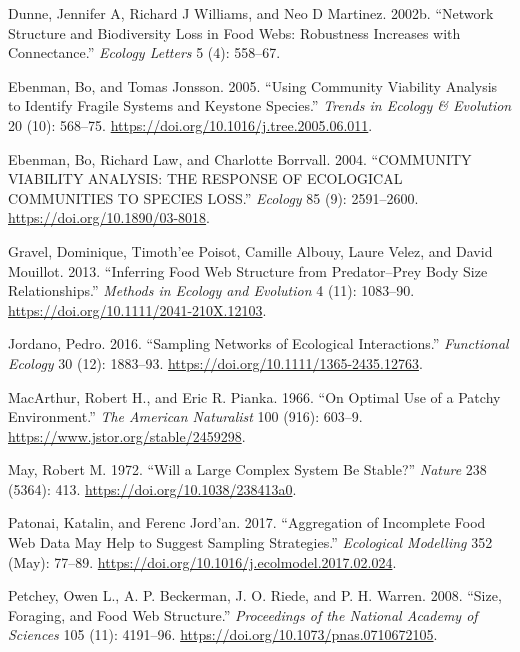 \documentclass{article}
\newlength{\cslhangindent}
\newlength{\cslentryspacingunit} %
\newenvironment{CSLReferences}[2] %
 {%
  \setlength{\parindent}{0pt}
  \ifodd #1
  \let\oldpar\par
  \def\par{\hangindent=\cslhangindent\oldpar}
  \fi
  \setlength{\parskip}{#2\cslentryspacingunit}
 }%
 {}
\begin{document}
\begin{CSLReferences}{1}{0}
\leavevmode{}%
Dunne, Jennifer A, Richard J Williams, and Neo D Martinez. 2002b.
{``Network Structure and Biodiversity Loss in Food Webs: Robustness
Increases with Connectance.''} \emph{Ecology Letters} 5 (4): 558--67.

\leavevmode{}%
Ebenman, Bo, and Tomas Jonsson. 2005. {``Using Community Viability
Analysis to Identify Fragile Systems and Keystone Species.''}
\emph{Trends in Ecology \& Evolution} 20 (10): 568--75.
\url{https://doi.org/10.1016/j.tree.2005.06.011}.

\leavevmode{}%
Ebenman, Bo, Richard Law, and Charlotte Borrvall. 2004. {``{COMMUNITY
VIABILITY ANALYSIS}: {THE RESPONSE OF ECOLOGICAL COMMUNITIES TO SPECIES
LOSS}.''} \emph{Ecology} 85 (9): 2591--2600.
\url{https://doi.org/10.1890/03-8018}.

\leavevmode{}%
Gravel, Dominique, Timoth'ee Poisot, Camille Albouy, Laure Velez, and
David Mouillot. 2013. {``Inferring Food Web Structure from
Predator--Prey Body Size Relationships.''} \emph{Methods in Ecology and
Evolution} 4 (11): 1083--90.
\url{https://doi.org/10.1111/2041-210X.12103}.

\leavevmode{}%
Jordano, Pedro. 2016. {``Sampling Networks of Ecological
Interactions.''} \emph{Functional Ecology} 30 (12): 1883--93.
\url{https://doi.org/10.1111/1365-2435.12763}.

\leavevmode{}%
MacArthur, Robert H., and Eric R. Pianka. 1966. {``On Optimal Use of a
Patchy Environment.''} \emph{The American Naturalist} 100 (916): 603--9.
\url{https://www.jstor.org/stable/2459298}.

\leavevmode{}%
May, Robert M. 1972. {``Will a {Large Complex System} Be {Stable}?''}
\emph{Nature} 238 (5364): 413. \url{https://doi.org/10.1038/238413a0}.

\leavevmode{}%
Patonai, Katalin, and Ferenc Jord'an. 2017. {``Aggregation of Incomplete
Food Web Data May Help to Suggest Sampling Strategies.''}
\emph{Ecological Modelling} 352 (May): 77--89.
\url{https://doi.org/10.1016/j.ecolmodel.2017.02.024}.

\leavevmode{}%
Petchey, Owen L., A. P. Beckerman, J. O. Riede, and P. H. Warren. 2008.
{``Size, Foraging, and Food Web Structure.''} \emph{Proceedings of the
National Academy of Sciences} 105 (11): 4191--96.
\url{https://doi.org/10.1073/pnas.0710672105}.


\end{CSLReferences}
\end{document}
